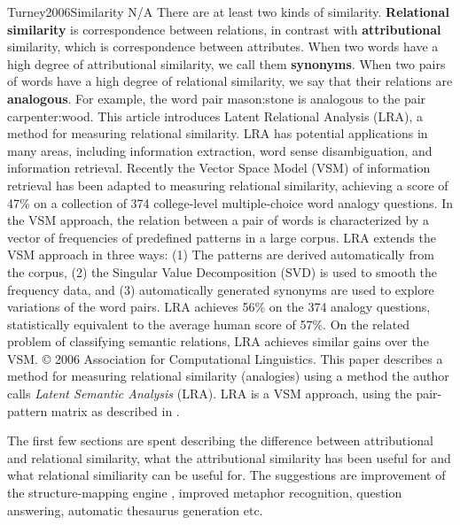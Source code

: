 \documentclass[10pt]{article}
\begin{document}
\begin{review}
        {Turney2006Similarity}
        {N/A}
        {
        There are at least two kinds of similarity. 
        \textbf{Relational similarity} is correspondence between relations, in contrast with \textbf{attributional} similarity, which is correspondence between attributes.
        When two words have a high degree of attributional similarity, we call them \textbf{synonyms}. 
        When two pairs of words have a high degree of relational similarity, we say that their relations are \textbf{analogous}. 
        For example, the word pair mason:stone is analogous to the pair carpenter:wood. 
        This article introduces Latent Relational Analysis (LRA), a method for measuring relational similarity. LRA has potential applications in many areas, including information extraction, word sense disambiguation, and information retrieval. 
        Recently the Vector Space Model (VSM) of information retrieval has been adapted to measuring relational similarity, achieving a score of 47\% on a collection of 374 college-level multiple-choice word analogy questions. 
        In the VSM approach, the relation between a pair of words is characterized by a vector of frequencies of predefined patterns in a large corpus. 
        LRA extends the VSM approach in three ways: (1) The patterns are derived automatically from the corpus, (2) the Singular Value Decomposition (SVD) is used to smooth the frequency data, and (3) automatically generated synonyms are used to explore variations of the word pairs. 
        LRA achieves 56\% on the 374 analogy questions, statistically equivalent to the average human score of 57\%. 
        On the related problem of classifying semantic relations, LRA achieves similar gains over the VSM. 
        © 2006 Association for Computational Linguistics.
        }
    This paper describes a method for measuring relational similarity (analogies) using a method the author calls \emph{Latent Semantic Analysis} (LRA).
    LRA is a VSM approach, using the pair-pattern matrix as described in \cite{Turney2010VsmOverview}.
    
    The first few sections are spent describing the difference between attributional and relational similarity, what the attributional similarity has been useful for and what relational similiarity can be useful for.
    The suggestions are improvement of the structure-mapping engine \cite{Gentner1983Structure}, improved metaphor recognition, question answering, automatic thesaurus generation etc.
    

\end{review}
\end{document}
